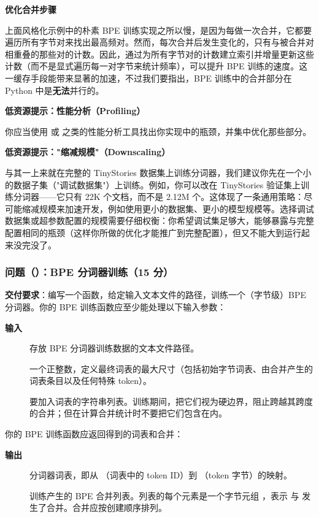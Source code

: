 \textbf{优化合并步骤}

上面风格化示例中的朴素 BPE 训练实现之所以慢，是因为每做一次合并，它都要遍历所有字节对来找出最高频对。然而，每次合并后发生变化的，只有与被合并对相重叠的那些对的计数。因此，通过为所有字节对的计数建立索引并增量更新这些计数（而不是显式遍历每一对字节来统计频率），可以提升 BPE 训练的速度。这一缓存手段能带来显著的加速，不过我们要指出，BPE 训练中的合并部分在 Python 中是\textbf{无法}并行的。

\textbf{低资源提示：性能分析（Profiling）}

你应当使用  或  之类的性能分析工具找出你实现中的瓶颈，并集中优化那些部分。

\textbf{低资源提示："缩减规模"（Downscaling）}

与其一上来就在完整的 TinyStories 数据集上训练分词器，我们建议你先在一个小的数据子集（"调试数据集"）上训练。例如，你可以改在 TinyStories 验证集上训练分词器——它只有 22K 个文档，而不是 2.12M 个。这体现了一条通用策略：尽可能缩减规模来加速开发，例如使用更小的数据集、更小的模型规模等。选择调试数据集或超参数配置的规模需要仔细权衡：你希望调试集足够大，能够暴露与完整配置相同的瓶颈（这样你所做的优化才能推广到完整配置），但又不能大到运行起来没完没了。

\subsubsection*{问题（）：BPE 分词器训练（15 分）}

\textbf{交付要求}：编写一个函数，给定输入文本文件的路径，训练一个（字节级）BPE 分词器。你的 BPE 训练函数应至少能处理以下输入参数：

\textbf{输入}
\begin{description}
  \item[] 存放 BPE 分词器训练数据的文本文件路径。
  \item[] 一个正整数，定义最终词表的最大尺寸（包括初始字节词表、由合并产生的词表条目以及任何特殊 token）。
  \item[] 要加入词表的字符串列表。训练期间，把它们视为硬边界，阻止跨越其跨度的合并；但在计算合并统计时不要把它们包含在内。
\end{description}

你的 BPE 训练函数应返回得到的词表和合并：

\textbf{输出}
\begin{description}
  \item[] 分词器词表，即从 （词表中的 token ID）到 （token 字节）的映射。
  \item[] 训练产生的 BPE 合并列表。列表的每个元素是一个字节元组 ，表示  与  发生了合并。合并应按创建顺序排列。
\end{description}

